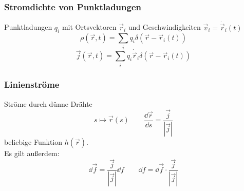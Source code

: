 \subsubsection{Stromdichte von Punktladungen}

Punktladungen $ q_i $ mit Ortsvektoren $ \vec{r}_i $ und Geschwindigkeiten $ \vec{v}_i = \dot{\vec{r}}_i(t) $
\begin{equation*}
\rho(\vec{r},t) = \sum_i q_i \delta(\vec{r} - \vec{r}_i(t)) 
\end{equation*}
\begin{equation*}
\vec{j}(\vec{r},t) = \sum_i q_i \dot{\vec{r}}_i \delta(\vec{r} - \vec{r}_i(t))
\end{equation*}
\begin{minipage}{.6\linewidth}
	\subsubsection{Linienströme}
	
	Ströme durch dünne Drähte
	$$ s \mapsto \vec{r}(s) \qquad \frac{\dd\vec{r}}{\dd s} = \frac{\vec{j}}{|\vec{j}|} $$
	beliebige Funktion $ h(\vec{r}) $.\\
	Es gilt außerdem:
	\begin{equation*}
	\dd \vec{f} = \frac{\vec{j}}{|\vec{j}|} \dd f \qquad \dd f = \dd \vec{f} \cdot \frac{\vec{j}}{|\vec{j}|}
	\end{equation*}
\end{minipage}%

